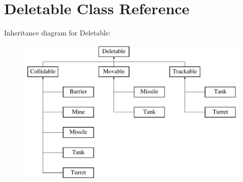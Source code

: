 \hypertarget{class_deletable}{\section{Deletable Class Reference}
\label{class_deletable}
}
Inheritance diagram for Deletable\+:\begin{figure}[H]
\begin{center}
\leavevmode
\includegraphics[height=7.000000cm]{class_deletable}
\end{center}
\end{figure}

